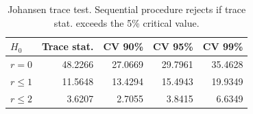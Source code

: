 \begin{table}[H]
\centering
\caption{Johansen trace test. Sequential procedure rejects if trace stat. exceeds the 5\% critical value.}
\label{tab:johansen_trace}
\begin{tabular}{lrrrr}
\toprule
$H_0$ & Trace stat. & CV 90\% & CV 95\% & CV 99\% \\
\midrule
$r=0$ & 48.2266 & 27.0669 & 29.7961 & 35.4628 \\
$r\leq 1$ & 11.5648 & 13.4294 & 15.4943 & 19.9349 \\
$r\leq 2$ & 3.6207 & 2.7055 & 3.8415 & 6.6349 \\
\bottomrule
\end{tabular}
\end{table}
